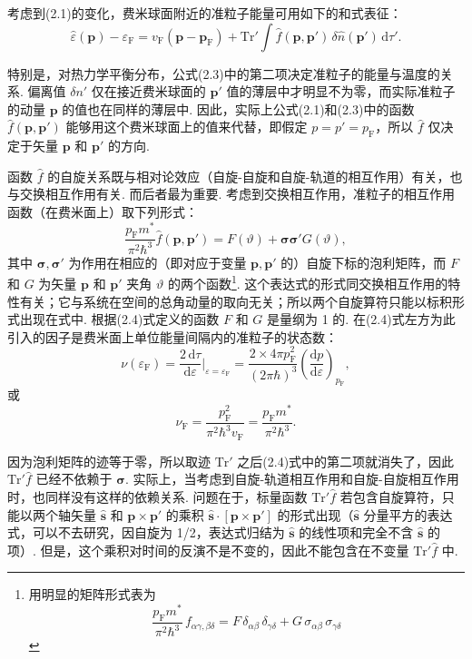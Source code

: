 考虑到(2.1)的变化，费米球面附近的准粒子能量可用如下的和式表征：
\begin{equation}
\hat\varepsilon(\bm p)-\varepsilon_{\mathrm F}=v_{\mathrm F}(\bm p-\bm p_{\mathrm F})+\mathrm{Tr}'\int\hat f(\bm p,\bm p')\,\delta\hat n(\bm p')\,\mathrm{d}\tau'.
\end{equation}

特别是，对热力学平衡分布，公式(2.3)中的第二项决定准粒子的能量与温度的关系. 偏离值 $\delta n'$ 仅在接近费米球面的 $\bm p'$ 值的薄层中才明显不为零，而实际准粒子的动量 $\bm p$ 的值也在同样的薄层中. 因此，实际上公式(2.1)和(2.3)中的函数 $\hat f(\bm p,\bm p')$ 能够用这个费米球面上的值来代替，即假定 $p=p'=p_{\mathrm F}$，所以 $\hat f$ 仅决定于矢量 $\bm p$ 和 $\bm p'$ 的方向.

函数 $\hat f$ 的自旋关系既与相对论效应（自旋-自旋和自旋-轨道的相互作用）有关，也与交换相互作用有关. 而后者最为重要. 考虑到交换相互作用，准粒子的相互作用函数（在费米面上）取下列形式：
\begin{equation}
\frac{p_{\mathrm F}m^{*}}{\pi^{2}\hbar^{3}}\hat f(\bm p,\bm p')=F(\vartheta)+\bm\sigma\bm\sigma'G(\vartheta),
\end{equation}
其中 $\bm\sigma,\bm\sigma'$ 为作用在相应的（即对应于变量 $\bm p,\bm p'$ 的）自旋下标的泡利矩阵，而 $F$ 和 $G$ 为矢量 $\bm p$ 和 $\bm p'$ 夹角 $\vartheta$ 的两个函数\footnote{用明显的矩阵形式表为
\begin{equation*}
\frac{p_{\mathrm F}m^{*}}{\pi^{2}\hbar^{3}}\,f_{\alpha\gamma,\beta\delta}=F\,\delta_{\alpha\beta}\,\delta_{\gamma\delta}+G\,\sigma_{\alpha\beta}\,\sigma_{\gamma\delta}\tag{2.4a}
\end{equation*}}. 这个表达式的形式同交换相互作用的特性有关；它与系统在空间的总角动量的取向无关；所以两个自旋算符只能以标积形式出现在式中. 根据(2.4)式定义的函数 $F$ 和 $G$ 是量纲为 1 的. 在(2.4)式左方为此引入的因子是费米面上单位能量间隔内的准粒子的状态数：
\begin{equation*}
\nu(\varepsilon_{\mathrm F})=\frac{2\,\mathrm{d}\tau}{\mathrm{d}\varepsilon}\bigg|_{\varepsilon=\varepsilon_{\mathrm F}}
=\frac{2\times4\pi p_{\mathrm F}^{2}}{(2\pi\hbar)^{3}}\left(\frac{\mathrm{d}p}{\mathrm{d}\varepsilon}\right)_{p_{\mathrm F}},
\end{equation*}
或
\begin{equation}
\nu_{\mathrm F}=\frac{p_{\mathrm F}^{2}}{\pi^{2}\hbar^{3}v_{\mathrm F}}=\frac{p_{\mathrm F}m^{*}}{\pi^{2}\hbar^{3}}.
\end{equation}

因为泡利矩阵的迹等于零，所以取迹 $\mathrm{Tr}'$ 之后(2.4)式中的第二项就消失了，因此 $\mathrm{Tr}'\hat f$ 已经不依赖于 $\bm\sigma$. 实际上，当考虑到自旋-轨道相互作用和自旋-自旋相互作用时，也同样没有这样的依赖关系. 问题在于，标量函数 $\mathrm{Tr}'\hat f$ 若包含自旋算符，只能以两个轴矢量 $\hat{\bm s}$ 和 $\bm p\times\bm p'$ 的乘积 $\hat{\bm s}\cdot[\bm p\times\bm p']$ 的形式出现（$\hat{\bm s}$ 分量平方的表达式，可以不去研究，因自旋为 1/2，表达式归结为 $\hat{\bm s}$ 的线性项和完全不含 $\hat{\bm s}$ 的项）. 但是，这个乘积对时间的反演不是不变的，因此不能包含在不变量 $\mathrm{Tr}'\hat f$ 中.

